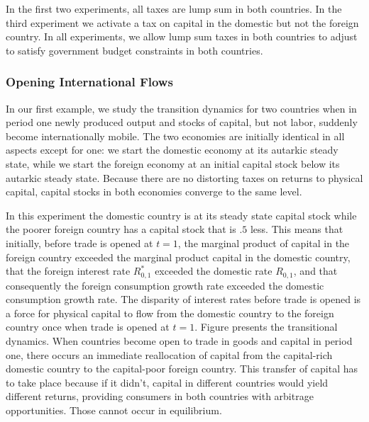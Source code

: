 In the first two experiments, all taxes are lump sum in both countries.  In the third experiment we activate
a tax on capital in the domestic but not the foreign country.
In all experiments, we allow lump sum taxes in both countries  to adjust to satisfy government budget constraints in both countries.

\subsubsection{Opening International Flows}
In our
first example, we study the transition dynamics for two countries when  in period one
newly produced output and stocks of capital, but not labor,  suddenly  become internationally mobile. The two economies are initially
identical
in all  aspects except for one: we start the domestic
economy at its  autarkic steady state, while we start the  foreign economy
at an initial capital stock  below its autarkic steady state. Because  there are no
distorting  taxes on returns to physical capital, capital stocks in both economies   converge to the same level.

In this experiment the domestic country is at its steady state capital stock while the poorer foreign country
has a capital stock that is $.5$ less.  This means that initially, before trade is opened at $t=1$, the
marginal product of capital in the foreign country exceeded the marginal product capital in the domestic country, that the
foreign interest rate $R_{0,1}^*$ exceeded the domestic rate $R_{0,1}$, and that consequently the foreign consumption growth rate exceeded the
domestic consumption growth rate. The disparity of interest rates before trade is opened is a force for physical capital to flow from the domestic
country to the foreign country once when trade is opened at $t=1$.
Figure  presents the transitional dynamics. When countries
become open to trade in goods and capital in period one, there occurs an immediate reallocation of capital from the
capital-rich domestic country to the capital-poor foreign country. This transfer of capital has to take place because if it didn't,
  capital
in different countries  would yield different returns, providing consumers in both countries with arbitrage opportunities.
Those cannot occur in equilibrium. %

